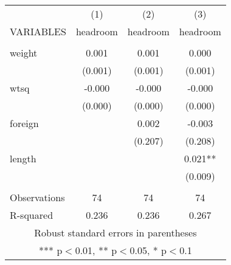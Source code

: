 \begin{tabular}{lccc} \hline
 & (1) & (2) & (3) \\
VARIABLES & headroom & headroom & headroom \\ \hline
 &  &  &  \\
weight & 0.001 & 0.001 & 0.000 \\
 & (0.001) & (0.001) & (0.001) \\
wtsq & -0.000 & -0.000 & -0.000 \\
 & (0.000) & (0.000) & (0.000) \\
foreign &  & 0.002 & -0.003 \\
 &  & (0.207) & (0.208) \\
length &  &  & 0.021** \\
 &  &  & (0.009) \\
 &  &  &  \\
Observations & 74 & 74 & 74 \\
 R-squared & 0.236 & 0.236 & 0.267 \\ \hline
\multicolumn{4}{c}{ Robust standard errors in parentheses} \\
\multicolumn{4}{c}{ *** p$<$0.01, ** p$<$0.05, * p$<$0.1} \\
\end{tabular}
